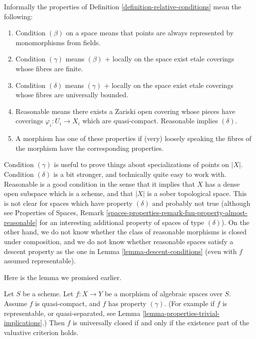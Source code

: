 \begin{remark}
\label{remark-reasonable}
Informally the properties of
Definition \ref{definition-relative-conditions}
mean the following:
\begin{enumerate}
\item Condition $(\beta)$ on a space means that points are always represented
by monomorphisms from fields.
\item Condition $(\gamma)$ means $(\beta)$ $+$ locally on the space exist etale
coverings whose fibres are finite.
\item Condition $(\delta)$ means $(\gamma)$ $+$ locally on the space exist
etale coverings whose fibres are universally bounded.
\item Reasonable means there exists a Zariski open covering whose
pieces have coverings $\varphi_i : U_i \to X_i$ which are quasi-compact.
Reasonable implies $(\delta)$.
\item A morphism has one of these properties if (very) loosely speaking the
fibres of the morphism have the corresponding properties.
\end{enumerate}
Condition $(\gamma)$ is useful to prove things about specializations of
points on $|X|$. Condition $(\delta)$ is a bit stronger, and technically
quite easy to work with. Reasonable is a good condition in the sense that
it implies that $X$ has a dense open subspace which is a scheme, and
that $|X|$ is a sober topological space. This is not clear for spaces
which have property $(\delta)$ and probably not true (although see
Properties of Spaces,
Remark \ref{spaces-properties-remark-fun-property-almost-reasonable}
for an interesting additional property of spaces of type $(\delta)$).
On the other hand, we do not know whether the class of reasonable
morphisms is closed under composition, and we do not know whether
reasonable spaces satisfy a descent property as the one in
Lemma \ref{lemma-descent-conditions} (even with $f$ assumed representable).
\end{remark}

\noindent
Here is the lemma we promised earlier.

\begin{lemma}
\label{lemma-re-characterize-universally-closed}
Let $S$ be a scheme.
Let $f : X \to Y$ be a morphism of algebraic spaces over $S$.
Assume $f$ is quasi-compact, and $f$ has property $(\gamma)$.
(For example if $f$ is representable, or quasi-separated, see
Lemma \ref{lemma-properties-trivial-implications}.)
Then $f$ is universally closed if and only if the
existence part of the valuative criterion holds.
\end{lemma}

